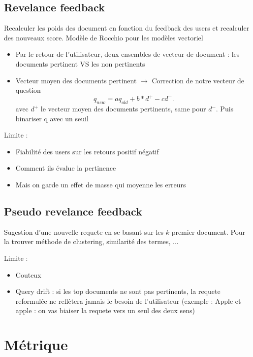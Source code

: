 \documentclass{article}
\theoremstyle{plain}%
\theoremstyle{definition}
\theoremstyle{remark}
\begin{document}
\subsection{Revelance feedback}
Recalculer les poids des document en fonction du feedback des users et recalculer des nouveaux score. Modèle de Rocchio pour les modèles vectoriel \begin{itemize}
    \item Par le retour de l'utilisateur, deux ensembles de vecteur de document : les documents pertinent VS les non pertinents
    \item Vecteur moyen des documents pertinent $\rightarrow$ Correction de notre vecteur de question 
    \[
        q_{new} = a q_{old} + b * d^+ - c d^-
    .\]
    avec $ d^+ $ le vecteur moyen des documents pertinents, same pour $ d^- $. Puis binariser q avec un seuil
\end{itemize}
Limite : 
\begin{itemize}
    \item Fiabilité des users sur les retours positif négatif 
    \item Comment ils évalue la pertinence
    \item Mais on garde un effet de masse qui moyenne les erreurs 
\end{itemize}

\subsection{Pseudo revelance feedback}
Sugestion d'une nouvelle requete en se basant sur les $ k $ premier document. Pour la trouver méthode de clustering, similarité des termes, ...

Limite : 
\begin{itemize}
    \item Couteux
    \item Query drift : si les top documents ne sont pas pertinents, la requete reformulée ne reflètera jamais le besoin de l'utilisateur (exemple : Apple et apple :  on vas biaiser la requete vers un seul des deux sens)
\end{itemize}

\section{Métrique}
\end{document}
